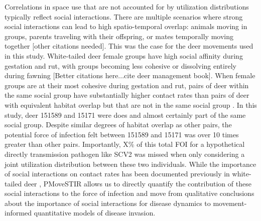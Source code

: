 \documentclass[letterpaper]{article}
\begin{document}
Correlations in space use that are not accounted for by utilization distributions typically reflect social interactions.  There are multiple scenarios where strong social interactions can lead to high spatio-temporal overlap: animals moving in groups, parents traveling with their offspring, or mates temporally moving together \citep{Yang2021} [other citations needed]. This was the case for the deer movements used in this study. White-tailed deer female groups have high social affinity during gestation and rut, with groups becoming less cohesive or dissolving entirely during fawning \citep{Koen2017} [Better citations here...cite deer management book].  When female groups are at their most cohesive during gestation and rut, pairs of deer within the same social group have substantially higher contact rates than pairs of deer with equivalent habitat overlap but that are not in the same social group \citep{Schauber2007a,Kjaer2008,Schauber2015a,Grear2010}.  In this study, deer 151589 and 15171 were does and almost certainly part of the same social group. Despite similar degrees of habitat overlap as other pairs, the potential force of infection felt between 151589 and 15171 was over 10 times greater than other pairs.  Importantly, X\% of this total FOI for a hypothetical directly transmission pathogen like SCV2 was missed when only considering a joint utilization distribution between these two individuals.  While the importance of social interactions on contact rates has been documented previously in white-tailed deer \citep{Grear2010,Schauber2015a}, PMoveSTIR allows us to directly quantify the contribution of these social interactions to the force of infection and move from qualitative conclusions about the importance of social interactions for disease dynamics to movement-informed quantitative models of disease invasion.
\end{document}
